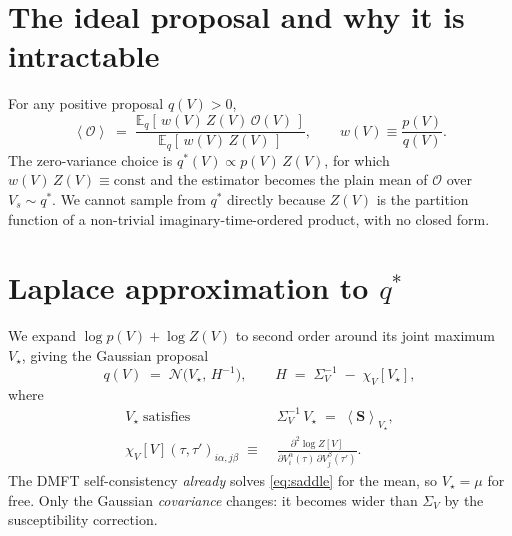 \documentclass[11pt]{article}
\newcommand{\ev}[1]{\left\langle #1 \right\rangle}
\newcommand{\Sig}{\Sigma_V}
\newcommand{\Sinv}{\Sig^{-1}}
\begin{document}
\section{The ideal proposal and why it is intractable}

For any positive proposal $q(V) > 0$,
\begin{equation}
  \ev{\mathcal{O}}
  \;=\;
  \frac{\mathbb{E}_q\!\left[\,w(V)\,Z(V)\,\mathcal{O}(V)\,\right]}
       {\mathbb{E}_q\!\left[\,w(V)\,Z(V)\,\right]},
  \qquad
  w(V) \equiv \frac{p(V)}{q(V)}.
  \label{eq:reweighted}
\end{equation}
The zero-variance choice is $q^{*}(V) \propto p(V)\,Z(V)$, for which
$w(V)\,Z(V) \equiv \mathrm{const}$ and the estimator becomes the plain
mean of $\mathcal{O}$ over $V_s\sim q^*$. We cannot sample from $q^*$
directly because $Z(V)$ is the partition function of a non-trivial
imaginary-time-ordered product, with no closed form.

\section{Laplace approximation to \texorpdfstring{$q^*$}{q*}}

We expand $\log p(V) + \log Z(V)$ to second order around its joint
maximum $V_\star$, giving the Gaussian proposal
\begin{equation}
  q(V) \;=\; \mathcal{N}\!\bigl(V_\star,\, H^{-1}\bigr),
  \qquad
  H \;=\; \Sinv \;-\; \chi_V[V_\star],
  \label{eq:H}
\end{equation}
where
\begin{align}
  V_\star \;\text{satisfies}\;\;& \Sinv\,V_\star \;=\; \ev{\mathbf{S}}_{V_\star},
  \label{eq:saddle}\\
  \chi_V[V](\tau,\tau')_{i\alpha,j\beta}
  \;\equiv\; & \frac{\partial^{2}\log Z[V]}{\partial V_i^\alpha(\tau)\,\partial V_j^\beta(\tau')}.
  \label{eq:chiV}
\end{align}
The DMFT self-consistency \emph{already} solves \eqref{eq:saddle} for the
mean, so $V_\star = \mu$ for free. Only the Gaussian \emph{covariance}
changes: it becomes wider than $\Sig$ by the susceptibility correction.
\end{document}
